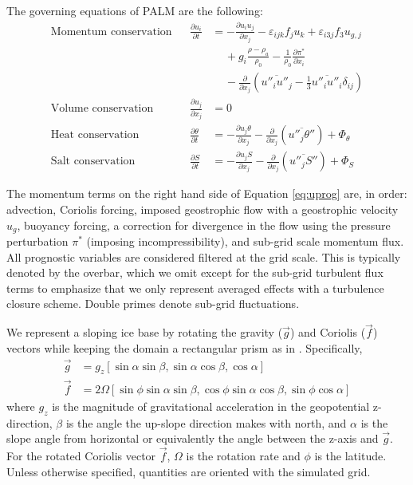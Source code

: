 \documentclass[tc, manuscript]{copernicus}
\begin{document}
The governing equations of PALM are the following:\\
\begin{align}
    \textrm{Momentum conservation} & &
        \frac{\partial u_i}{\partial t} &= 
        -\frac{\partial u_i u_j}{\partial x_j}
        -\varepsilon_{ijk} f_j u_k 
        + \varepsilon_{i3j} f_3 u_{g,j}\nonumber\\
     &&& \quad \, + g_i \frac{\rho - \rho_a}{\rho_0} 
        - \frac{1}{\rho_0}\frac{\partial \pi^*}{\partial x_i} \nonumber\\
     &&& \quad \, - \frac{\partial}{\partial x_j}\left(\overline{u''_i u''_j} 
        - \frac{1}{3}\overline{u''_i u''_i}\delta_{ij}\right) \label{eq:uprog}\\
    \textrm{Volume conservation} & &
        \frac{\partial u_j}{\partial x_j} &= 0\label{eq:volconserv}\\
    \textrm{Heat conservation} & &
        \frac{\partial \theta}{\partial t} &= 
        -\frac{\partial u_j \theta}{\partial x_j} 
        - \frac{\partial}{\partial x_j}\left(\overline{u''_j \theta''}\right) 
        + \Phi_{\theta}\label{eq:ptprog}\\
    \textrm{Salt conservation} & &
        \frac{\partial S}{\partial t} &= 
        -\frac{\partial u_j S}{\partial x_j} 
        - \frac{\partial}{\partial x_j}\left(\overline{u''_j S''}\right) 
        + \Phi_{S}\label{eq:saprog}
\end{align}

The momentum terms on the right hand side of Equation \ref{eq:uprog} are, in order: advection, Coriolis forcing, imposed geostrophic flow with a geostrophic velocity $u_g$, buoyancy forcing, a correction for divergence in the flow using the pressure perturbation $\pi^*$ (imposing incompressibility), and sub-grid scale momentum flux. All prognostic variables are considered filtered at the grid scale. This is typically denoted by the overbar, which we omit except for the sub-grid turbulent flux terms to emphasize that we only represent averaged effects with a turbulence closure scheme. Double primes denote sub-grid fluctuations. 

We represent a sloping ice base by rotating the gravity ($\vec{g}$) and Coriolis ($\vec{f}$) vectors while keeping the domain a rectangular prism as in \citet{vreugdenhil_stratification_2019}. 
Specifically, 
\begin{align}
	\vec{g} &= g_z [\sin \alpha \sin \beta, \sin \alpha \cos \beta,\cos \alpha]\label{eq:g}\\
    \vec{f} &= 2 \Omega [\sin \phi \sin \alpha \sin \beta,\cos \phi \sin \alpha \cos \beta,\sin \phi \cos \alpha]\label{eq:f}
\end{align}
where $g_z$ is the magnitude of gravitational acceleration in the geopotential z-direction, $\beta$ is the angle the up-slope direction makes with north, and $\alpha$ is the slope angle from horizontal or equivalently the angle between the z-axis and $\vec{g}$. For the rotated Coriolis vector $\vec{f}$, $\Omega$ is the rotation rate and $\phi$ is the latitude. Unless otherwise specified, quantities are oriented with the simulated grid.
\end{document}
